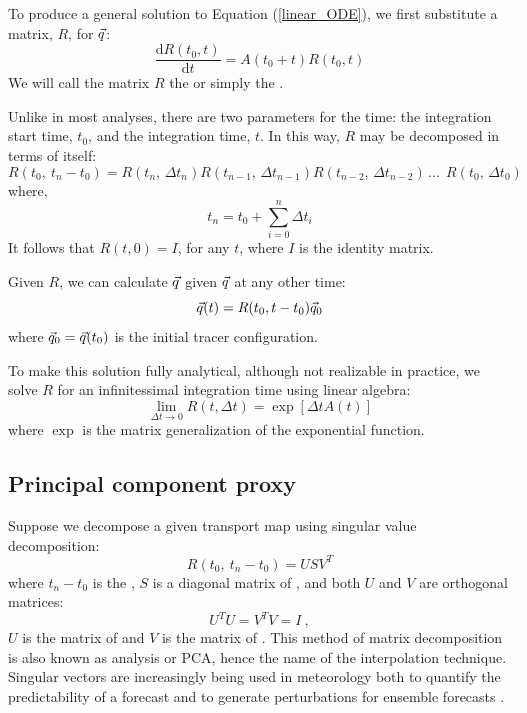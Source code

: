 To produce a general solution to Equation (\ref{linear_ODE}), 
we first substitute a matrix, $R$, for $\vec q$:
\begin{equation}
	\frac{\mathrm d R(t_0, t)}{\mathrm d t} = A(t_0+t) R(t_0, t)
\end{equation}
We will call the matrix $R$ the  or simply
the .

Unlike in most analyses, there are two parameters for the time:
the integration start time, $t_0$, and the integration time, $t$.
In this way, $R$ may be decomposed in terms of itself:
\begin{equation}
	R(t_0,~t_n-t_0) = R(t_n, \, \Delta t_n) R(t_{n-1},\,\Delta t_{n-1}) R(t_{n-2},\,\Delta t_{n-2}) \, ...~~ 
	R(t_0,\,\Delta t_0)
\label{matrix_soln_decomposition}
\end{equation}
where,
\begin{equation}
t_n=t_0+\sum_{i=0}^{n} \Delta t_i
\end{equation}
It follows that $R(t, 0)=I$, for any $t$, where $I$ is the identity matrix.

Given $R$, 
we can calculate $\vec q$ given $\vec q$ at any other time:
\begin{equation}
	\vec q(t) = R(t_0, t-t_0) \vec q_0
	\label{tracer_integration}
\end{equation}
where $\vec q_0 = \vec q(t_0)$ is the initial tracer configuration.

To make this solution fully analytical, although not realizable in practice,
we solve $R$ for an infinitessimal integration time using linear algebra:
\begin{equation}
	\lim_{\Delta t \rightarrow 0} R(t, \Delta t) = \exp \left [ \Delta t A(t) \right ]
\end{equation}
where $\exp$ is the matrix generalization of the exponential function.

\subsection{Principal component proxy}

Suppose we decompose a given transport map using singular value decomposition:
\begin{equation}
	R(t_0, ~ t_n - t_0) = U S V^T
	\label{SVD}
\end{equation}
where 
$t_n - t_0$ is the ,
$S$ is a diagonal matrix of ,
and both $U$ and $V$ are orthogonal matrices:
\begin{equation}
	U^T U = V^T V = I~,
\end{equation}
$U$ is the matrix of  and 
$V$ is the matrix of  \citep{Press_etal1992}.
This method of matrix decomposition is also known as 
analysis or PCA, hence the name of the interpolation technique.
Singular vectors are increasingly being used in meteorology both to quantify the
predictability of a forecast and to generate perturbations for ensemble
forecasts \citep{Tang_etal2006}.


